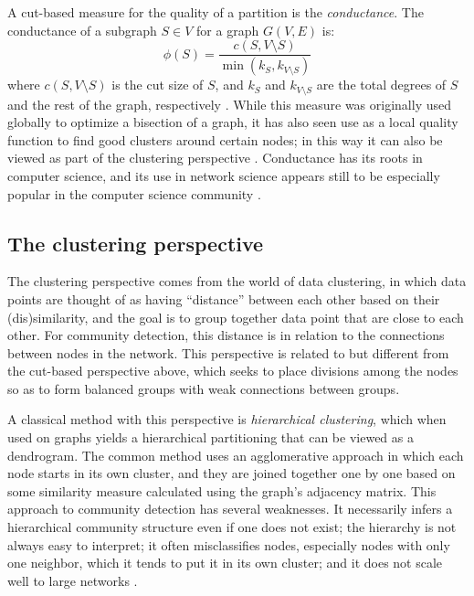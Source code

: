 A cut-based measure for the quality of a partition is the
\emph{conductance}. The conductance of a subgraph \(S \in V\) for a
graph \(G(V, E)\) is:
\[\phi(S) = \frac{c(S, V \setminus S)}{\min(k_S, k_{V \setminus S})}\]
where \(c(S, V \setminus S)\) is the cut size of \(S\), and \(k_S\) and
\(k_{V \setminus S}\) are the total degrees of \(S\) and the rest of the
graph, respectively \autocite{schaeffer_graph_2007}. While this measure
was originally used globally to optimize a bisection of a graph, it has
also seen use as a local quality function to find good clusters around
certain nodes; in this way it can also be viewed as part of the
clustering perspective \autocite{schaub_many_2017}. Conductance has its
roots in computer science, and its use in network science appears still
to be especially popular in the computer science community
\autocites{schaeffer_graph_2007}{yang_defining_2015}.

\hypertarget{the-clustering-perspective}{\subsection{The clustering
perspective}\label{the-clustering-perspective}}

The clustering perspective comes from the world of data clustering, in
which data points are thought of as having ``distance'' between each
other based on their (dis)similarity, and the goal is to group together
data point that are close to each other. For community detection, this
distance is in relation to the connections between nodes in the network.
This perspective is related to but different from the cut-based
perspective above, which seeks to place divisions among the nodes so as
to form balanced groups with weak connections between groups.

A classical method with this perspective is \emph{hierarchical
clustering}, which when used on graphs yields a hierarchical
partitioning that can be viewed as a dendrogram. The common method uses
an agglomerative approach in which each node starts in its own cluster,
and they are joined together one by one based on some similarity measure
calculated using the graph's adjacency matrix. This approach to
community detection has several weaknesses. It necessarily infers a
hierarchical community structure even if one does not exist; the
hierarchy is not always easy to interpret; it often misclassifies nodes,
especially nodes with only one neighbor, which it tends to put it in its
own cluster; and it does not scale well to large networks
\autocite{fortunato_community_2010}.

